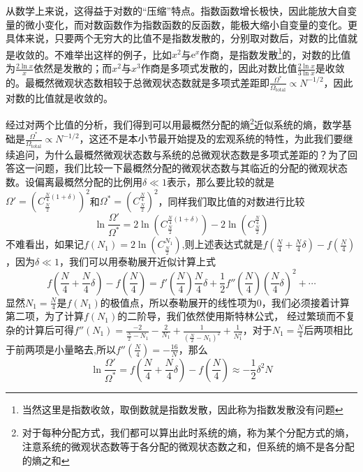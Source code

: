 \documentclass[../../main.tex]{subfiles}
\begin{document}
从数学上来说，这得益于对数的“压缩”特点。指数函数增长极快，因此能放大自变量的微小变化，而对数函数作为指数函数的反函数，能极大缩小自变量的变化。更具体来说，只要两个无穷大的比值不是指数发散的，分别取对数后，对数的比值就是收敛的。不难举出这样的例子，比如\(x^2\)与\(\mathrm{e}^x\)作商，是指数发散\footnote{当然这里是指数收敛，取倒数就是指数发散，因此称为指数发散没有问题}的，对数的比值为\(\frac{2\ln x}{x}\)依然是发散的；而\(x^2\)与\(x^3\)作商是多项式发散的，因此对数比值\(\frac{2\ln x}{3\ln x}\)是收敛的。最概然微观状态数相较于总微观状态数就是多项式差距即\(\frac{\Omega^*}{\Omega_{\text{total}}}\propto N^{-1/2}\)，因此对数的比值就是收敛的。

经过对两个比值的分析，我们得到可以用最概然分配的熵\footnote{对于每种分配方式，我们都可以算出此时系统的熵，称为某个分配方式的熵，注意系统的微观状态数等于各分配的微观状态数之和，但系统的熵不是各分配的熵之和}近似系统的熵，数学基础是\(\frac{\Omega^*}{\Omega_{\text{total}}}\propto N^{-1/2}\)，这还不是本小节最开始提及的宏观系统的特性，为此我们要继续追问，为什么最概然微观状态数与系统的总微观状态数是多项式差距的？为了回答这一问题，我们比较一下最概然分配的微观状态数与其临近的分配的微观状态数。设偏离最概然分配的比例用\(\delta \ll 1\)表示，那么要比较的就是\(\Omega'=\left(C_{\frac{N}{2}}^{\frac{N}{4}(1+\delta)}\right)^2\)和\(\Omega^*=\left(C_{\frac{N}{2}}^{\frac{N}{4}}\right)^2\)，同样我们取比值的对数进行比较
\begin{equation*}
    \ln \frac{\Omega'}{\Omega^*}=2\ln\left(C_{\frac{N}{2}}^{\frac{N}{4}(1+\delta)}\right)-2\ln\left(C_{\frac{N}{2}}^{\frac{N}{4}}\right)
\end{equation*}
不难看出，如果记\(f(N_1)=2\ln\left(C_{\frac{N}{2}}^{N_1}\right)\),则上述表达式就是\(f\left(\frac{N}{4}+\frac{N}{4}\delta\right)-f\left(\frac{N}{4}\right)\)，因为\(\delta \ll 1\)，我们可以用泰勒展开近似计算上式
\begin{equation*}
    f\left(\frac{N}{4}+\frac{N}{4}\delta\right)-f\left(\frac{N}{4}\right)=f'\left(\frac{N}{4}\right)\frac{N}{4}\delta+\frac{1}{2}f''\left(\frac{N}{4}\right)\left(\frac{N}{4}\delta\right)^2+\cdots
\end{equation*}
显然\(N_1=\frac{N}{4}\)是\(f(N_1)\)的极值点，所以泰勒展开的线性项为0，我们必须接着计算第二项，为了计算\(f(N_1)\)的二阶导，我们依然使用斯特林公式，
经过繁琐而不复杂的计算后可得\(\displaystyle f''(N_1)=\frac{-2}{\frac{N}{2}-N_1}-\frac{2}{N_1}+\frac{1}{\left(\frac{N}{2}-N_1\right)^2}+\frac{1}{N_1^2}\)，对于\(N_1=\frac{N}{4}\)后两项相比于前两项是小量略去,所以\(f''(\frac{N}{4})=-\frac{16}{N}\)，那么
\begin{equation*}
    \ln \frac{\Omega'}{\Omega^*}=f\left(\frac{N}{4}+\frac{N}{4}\delta\right)-f\left(\frac{N}{4}\right)\approx -\frac{1}{2}\delta^2 N
\end{equation*}
\end{document}
